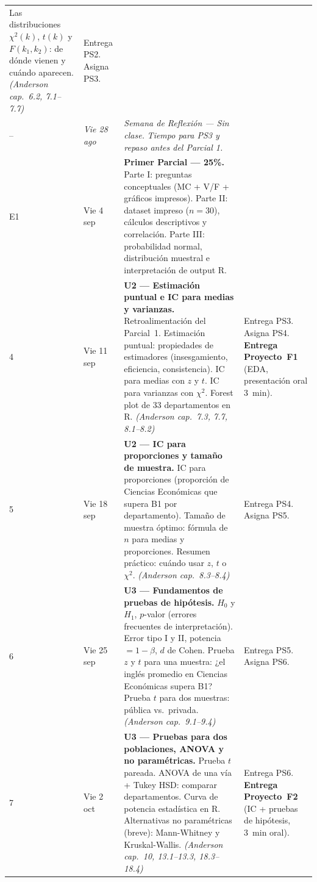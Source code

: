\documentclass[11pt, a4paper]{article}
\begin{document}
{\begin{longtable}{C{0.7cm} L{2.1cm} L{6.4cm} L{5.2cm}}
  Las distribuciones $\chi^2(k)$, $t(k)$ y $F(k_1,k_2)$:
  de d\'onde vienen y cu\'ando aparecen.
  \textit{(Anderson cap.\ 6.2, 7.1--7.7)} &
  Entrega PS2. Asigna PS3. \\[3pt]
%
-- & \textit{Vie 28 ago} &
  \textit{Semana de Reflexi\'on --- Sin clase.}
  \textit{Tiempo para PS3 y repaso antes del Parcial 1.} & \\[3pt]
%
E1 & Vie 4 sep &
  \textbf{Primer Parcial --- 25\%.}
  Parte I: preguntas conceptuales (MC + V/F + gr\'aficos impresos).
  Parte II: dataset impreso ($n = 30$), c\'alculos descriptivos y correlaci\'on.
  Parte III: probabilidad normal, distribuci\'on muestral e interpretaci\'on de output R. & \\[3pt]
%
%
4  & Vie 11 sep &
  \textbf{U2 --- Estimaci\'on puntual e IC para medias y varianzas.}
  Retroalimentaci\'on del Parcial~1.
  Estimaci\'on puntual: propiedades de estimadores
  (insesgamiento, eficiencia, consistencia).
  IC para medias con $z$ y $t$. IC para varianzas con $\chi^2$.
  Forest plot de 33 departamentos en R.
  \textit{(Anderson cap.\ 7.3, 7.7, 8.1--8.2)} &
  Entrega PS3. Asigna PS4.
  \textbf{Entrega Proyecto~F1} (EDA, presentaci\'on oral 3~min). \\[3pt]
%
5  & Vie 18 sep &
  \textbf{U2 --- IC para proporciones y tama\~no de muestra.}
  IC para proporciones (proporci\'on de Ciencias Econ\'omicas que supera B1 por departamento).
  Tama\~no de muestra \'optimo: f\'ormula de $n$ para medias y proporciones.
  Resumen pr\'actico: cu\'ando usar $z$, $t$ o $\chi^2$.
  \textit{(Anderson cap.\ 8.3--8.4)} &
  Entrega PS4. Asigna PS5. \\[3pt]
%
6  & Vie 25 sep &
  \textbf{U3 --- Fundamentos de pruebas de hip\'otesis.}
  $H_0$ y $H_1$, $p$-valor (errores frecuentes de interpretaci\'on).
  Error tipo I y II, potencia $= 1 - \beta$, $d$ de Cohen.
  Prueba $z$ y $t$ para una muestra: ¿el ingl\'es promedio en Ciencias Econ\'omicas supera B1?
  Prueba $t$ para dos muestras: p\'ublica vs.\ privada.
  \textit{(Anderson cap.\ 9.1--9.4)} &
  Entrega PS5. Asigna PS6. \\[3pt]
%
7  & Vie 2 oct &
  \textbf{U3 --- Pruebas para dos poblaciones, ANOVA y no param\'etricas.}
  Prueba $t$ pareada.
  ANOVA de una v\'ia + Tukey HSD: comparar departamentos.
  Curva de potencia estad\'istica en R.
  Alternativas no param\'etricas (breve): Mann-Whitney y Kruskal-Wallis.
  \textit{(Anderson cap.\ 10, 13.1--13.3, 18.3--18.4)} &
  Entrega PS6.
  \textbf{Entrega Proyecto~F2} (IC + pruebas de hip\'otesis, 3~min oral). \\[3pt]

\end{longtable}}
\end{document}
